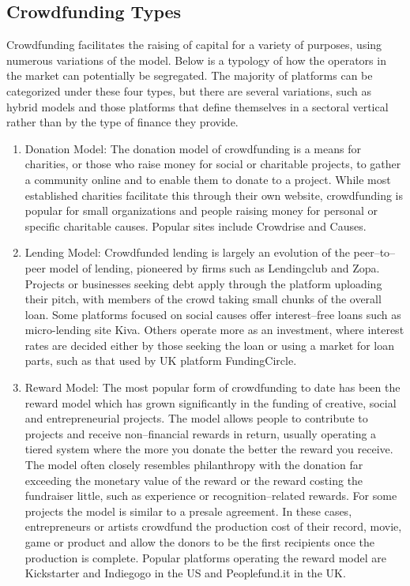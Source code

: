 \subsection*{ Crowdfunding Types }
Crowdfunding facilitates the raising of capital for a variety of purposes, using numerous variations of the model. Below is a typology of how the operators in the market can potentially be segregated. The majority of platforms can be categorized under these four types, but there are several variations, such as hybrid models and those platforms that define themselves in a sectoral vertical rather than by the type of finance they provide.
\begin{enumerate}
      \item Donation Model:
            The donation model of crowdfunding is a means for charities, or those who raise money for social or charitable projects, to gather a community online and to enable them to donate to a project. While most established charities facilitate this through their own website, crowdfunding is popular for small organizations and people raising money for personal or specific charitable causes. Popular sites include Crowdrise and Causes.
      \item Lending Model:
            Crowdfunded lending is largely an evolution of the peer–to–peer model of lending, pioneered by firms such as Lendingclub and Zopa. Projects or businesses seeking debt apply through the platform uploading their pitch, with members of the crowd taking small chunks of the overall loan. Some platforms focused on social causes offer interest–free loans such as micro-lending site Kiva. Others operate more as an investment, where interest rates are decided either by those seeking the loan or using a market for loan parts, such as that used by UK platform FundingCircle.
      \item Reward Model:
            The most popular form of crowdfunding to date has been the reward model which has grown significantly in the funding of creative, social and entrepreneurial projects.
            The model allows people to contribute to projects and receive non–financial rewards in return, usually operating a tiered system where the more you donate the better the reward you receive. The model often closely resembles philanthropy with the donation far exceeding the monetary value of the reward or the reward costing the fundraiser little, such as experience or recognition–related rewards. For some projects the model is similar to a presale agreement.
            In these cases, entrepreneurs or artists crowdfund the production cost of their record, movie, game or product and allow the donors to be the first recipients once the production is complete. Popular platforms operating the reward model are Kickstarter and Indiegogo in the US and Peoplefund.it in the UK.

\end{enumerate}
